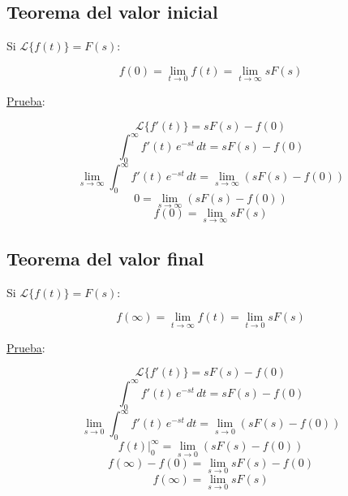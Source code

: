 \begin{figure}[H]
    \centering
    
\end{figure}

\subsection{Teorema del valor inicial}
Si $\mathcal{L}\{f(t)\}=F(s)$:

\begin{equation}
    f(0)=\lim_{t\rightarrow{0}}f(t)=\lim_{t\rightarrow\infty}sF(s)
\end{equation}

\underline{Prueba}:

\begin{equation*}
    \mathcal{L}\{f'(t)\}=sF(s)-f(0)
\end{equation*}
\begin{equation*}
    \int_0^{\infty}f'(t)\,e^{-st}\,dt=sF(s)-f(0)
\end{equation*}
\begin{equation*}
    \lim_{s\rightarrow\infty}\int_0^{\infty}f'(t)\,e^{-st}\,dt
        =\lim_{s\rightarrow\infty}(sF(s)-f(0))
\end{equation*}
\begin{equation*}
    0=\lim_{s\rightarrow\infty}(sF(s)-f(0))
\end{equation*}
\begin{equation*}
    f(0)=\lim_{s\rightarrow\infty}sF(s)
\end{equation*}

\subsection{Teorema del valor final}
Si $\mathcal{L}\{f(t)\}=F(s)$:

\begin{equation}
    f(\infty)=\lim_{t\rightarrow\infty}f(t)=\lim_{t\rightarrow{0}}sF(s)
\end{equation}

\underline{Prueba}:

\begin{equation*}
    \mathcal{L}\{f'(t)\}=sF(s)-f(0)
\end{equation*}
\begin{equation*}
    \int_0^{\infty}f'(t)\,e^{-st}\,dt=sF(s)-f(0)
\end{equation*}
\begin{equation*}
    \lim_{s\rightarrow{0}}\int_0^{\infty}f'(t)\,e^{-st}\,dt
        =\lim_{s\rightarrow{0}}(sF(s)-f(0))
\end{equation*}
\begin{equation*}
    f(t)\Biggr|_0^{\infty}=\lim_{s\rightarrow{0}}(sF(s)-f(0))
\end{equation*}
\begin{equation*}
    f(\infty)-f(0)=\lim_{s\rightarrow{0}}sF(s)-f(0)
\end{equation*}
\begin{equation*}
    f(\infty)=\lim_{s\rightarrow{0}}sF(s)
\end{equation*}

